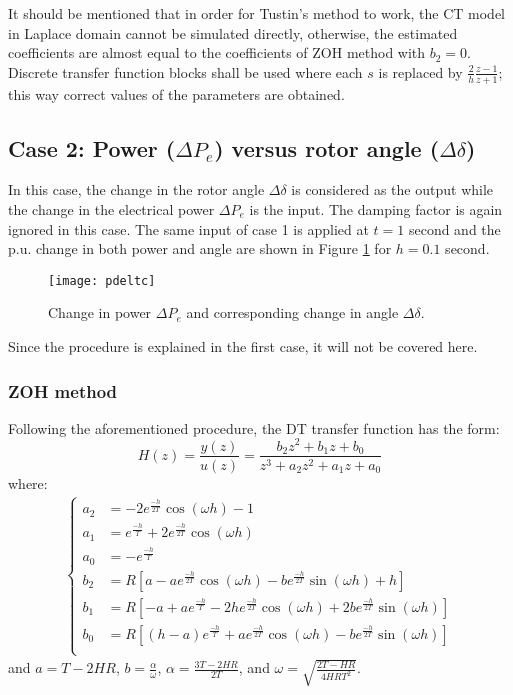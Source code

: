 \documentclass[10pt,journal,final]{IEEEtran}
\begin{document}
It should be mentioned that in order for Tustin's method to work, the CT model in Laplace domain cannot be simulated directly, otherwise, the estimated coefficients are almost equal to the coefficients of ZOH method with $b_{2}=0$. Discrete transfer function blocks shall be used where each $s$ is replaced by $\frac{2}{h}\frac{z-1}{z+1}$; this way correct values of the parameters are obtained.
\subsection{Case 2: Power ($\Delta P_{e}$) versus rotor angle ($\Delta \delta$)}
In this case, the change in the rotor angle $\Delta \delta$ is considered as the output while the change in the electrical power $\Delta P_{e}$ is the input. The damping factor is again {ignored} in this case. The same input of case 1 is applied at $t=1$ second and the p.u. change in both power and angle are shown in Figure \ref{fig:pangle} for $h=0.1$ second.
\begin{figure}[h!]
\centering
\texttt{[image: pdeltc]}
\caption{Change in power $\Delta P_{e}$ and corresponding change in angle $\Delta \delta$.}
\label{fig:pangle}
\end{figure}
Since the procedure is explained in the first case, it will not be covered here.
\subsubsection{ZOH method}
Following the aforementioned procedure, the DT transfer function has the form:
\begin{equation}\label{Zforfelta}
H(z)=\frac{y(z)}{u(z)}=\frac{b_{2}z^{2}+b_{1}z+b_{0}}{z^{3}+a_{2}z^{2}+a_{1}z+a_{0}}
\end{equation}
where:
\begin{align}
\begin{cases}
a_{2}&=-2e^{\frac{-h}{2T}}\cos{(\omega h)}-1\\
a_{1}&=e^{\frac{-h}{T}}+2e^{\frac{-h}{2T}}\cos{(\omega h)}\\
a_{0}&=-e^{\frac{-h}{T}}\\
b_{2}&=R\left[a-ae^{\frac{-h}{2T}}\cos{(\omega h)}-be^{\frac{-h}{2T}}\sin{(\omega h)}+h\right]\\
b_{1}&=R[-a+ae^{\frac{-h}{T}}-2he^{\frac{-h}{2T}}\cos{(\omega h)}+2be^{\frac{-h}{2T}}\sin{(\omega h)}]\\
b_{0}&=R\left[(h-a)e^{\frac{-h}{T}}+ae^{\frac{-h}{2T}}\cos{(\omega h)}-be^{\frac{-h}{2T}}\sin{(\omega h)}\right]\\
\end{cases}
\end{align}
and $a=T-2HR$, $b=\frac{\alpha}{\omega}$, $\alpha=\frac{3T-2HR}{2T}$, and $\omega=\sqrt{\frac{2T-HR}{4HRT^{2}}}$.
\end{document}
